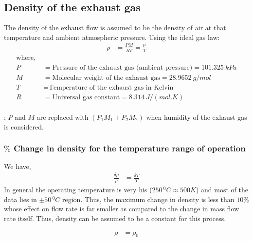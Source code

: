 \subsection{Density of the exhaust gas}

The density of the exhaust flow is assumed to be the density of air at that
temperature and ambient atmospheric pressure. Using the ideal gas law:
\begin{align}
    \rho &= \frac{PM}{R T} = \frac{\mu}{T}
\end{align}
\begin{align*}
    \text{where, } &\\
    P &= \text{Pressure of the exhaust gas (ambient pressure)} = 101.325 \: kPa\\
    M &= \text{Molecular weight of the exhaust gas} = 28.9652 \: g/mol\\
    T &= \text{Temperature of the exhaust gas in Kelvin}\\
    R &= \text{Universal gas constant} = 8.314 \: J/(mol.K)\\
\end{align*}

: $P$ and $M$ are replaced with $(P_1 M_1 + P_2 M_2)$ when humidity of the exhaust gas is considered.

\subsubsection{$\%$ Change in density for the temperature range of operation}
We have,
\begin{align*}
    \frac{\delta \rho}{\rho} &= \frac{\delta T}{T}
\end{align*}
In general the operating temperature is very his ($250 \,^0 C \approx 500 K$) and most of the data lies in $\pm 50 \, ^0 C$ region. Thus, the maximum change in density is less than $10\%$ whose effect on flow rate is far smaller as compared to the change in mass flow rate itself. Thus, density can be assumed to be a constant for this process.

\begin{align}
    \rho &= \rho_0
\end{align}



